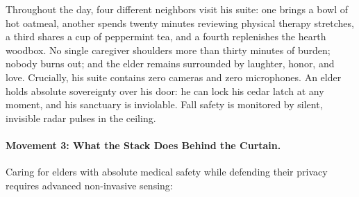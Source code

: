 Throughout the day, four different neighbors visit his suite: one brings a bowl of hot oatmeal, another spends twenty minutes reviewing physical therapy stretches, a third shares a cup of peppermint tea, and a fourth replenishes the hearth woodbox. No single caregiver shoulders more than thirty minutes of burden; nobody burns out; and the elder remains surrounded by laughter, honor, and love. Crucially, his suite contains zero cameras and zero microphones. An elder holds absolute sovereignty over his door: he can lock his cedar latch at any moment, and his sanctuary is inviolable. Fall safety is monitored by silent, invisible radar pulses in the ceiling.

\paragraph{Movement 3: What the Stack Does Behind the Curtain.}
Caring for elders with absolute medical safety while defending their privacy requires advanced non-invasive sensing:

